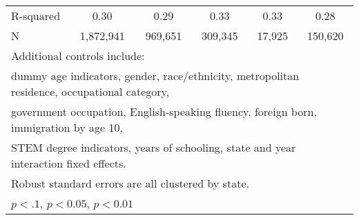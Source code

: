 \begin{table}[htbp]
\begin{tabular}{l*{5}{c}}
R-squared           &        0.30         &        0.29         &        0.33         &        0.33         &        0.28         \\
N                   &   1,872,941         &     969,651         &     309,345         &      17,925         &     150,620         \\
\bottomrule
\multicolumn{6}{l}{\footnotesize Additional controls include:}\\
\multicolumn{6}{l}{\footnotesize dummy age indicators, gender, race/ethnicity, metropolitan residence, occupational category,}\\
\multicolumn{6}{l}{\footnotesize government occupation, English-speaking fluency, foreign born, immigration by age 10,}\\
\multicolumn{6}{l}{\footnotesize STEM degree indicators, years of schooling, state and year interaction fixed effects.}\\
\multicolumn{6}{l}{\footnotesize Robust standard errors are all clustered by state.}\\
\multicolumn{6}{l}{\footnotesize \sym{*} \(p<.1\), \sym{**} \(p<0.05\), \sym{***} \(p<0.01\)}\\
\end{tabular}
\end{table}
